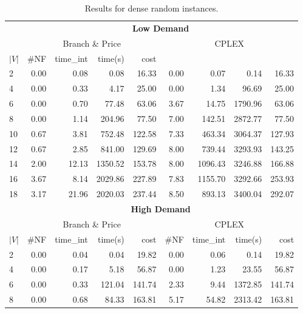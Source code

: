 \begin{table*}[h]
\small
\begin{center}
\caption{Results for dense random instances.}\label{tab:dense}
\begin{tabular} {l | r r r r | r r r r }
\hline
      &  \multicolumn{8}{c}{ \textbf{Low Demand} }                           \\
      &  \multicolumn{4}{c|}{Branch \& Price} & \multicolumn{4}{c}{CPLEX}    \\ 
$|V|$ & \#NF &  time\_int    &  time(s)       &  cost                         \\
\hline      
2&   0.00 & 0.08 & 0.08 & 16.33 & 0.00 & 0.07 & 0.14 & 16.33                \\  
4&   0.00 & 0.33 & 4.17 & 25.00 & 0.00 & 1.34 & 96.69 & 25.00               \\
6&   0.00 & 0.70 & 77.48 & 63.06 & 3.67 & 14.75 & 1790.96 & 63.06           \\
8&   0.00 & 1.14 & 204.96 & 77.50 & 7.00 & 142.51 & 2872.77 & 77.50         \\
10&  0.67 & 3.81 & 752.48 & 122.58 & 7.33 & 463.34 & 3064.37 & 127.93       \\
12&  0.67 & 2.85 & 841.00 & 129.69 & 8.00 & 739.44 & 3293.93 & 143.25       \\
14&  2.00 & 12.13 & 1350.52 & 153.78 & 8.00 & 1096.43 & 3246.88 & 166.88    \\
16&  3.67 & 8.14 & 2029.86 & 227.89 & 7.83  & 1155.70 & 3292.66 & 253.93    \\
18&  3.17 & 21.96 & 2020.03 & 237.44 & 8.50 & 893.13 & 3400.04 & 292.07     \\ 
\hline
       & \multicolumn{8}{c}{ \textbf{High Demand}} \\
       &       \multicolumn{4}{c|}{Branch \& Price} & \multicolumn{4}{c}{CPLEX}               \\  
$|V|$  & \#NF &  time\_int    &  time(s)       &  cost          &  \#NF &  time\_int  &  time(s)       &  cost \\
\hline      
2&    0.00 & 0.04 & 0.04 & 19.82 & 0.00 & 0.06 & 0.14 & 19.82              \\  
4&    0.00 & 0.17 & 5.18 & 56.87 & 0.00 & 1.23 & 23.55 & 56.87             \\
6&    0.00 & 0.33 & 121.04 & 141.74 & 2.33 & 9.44 & 1372.85 & 141.74       \\
8&    0.00 & 0.68 & 84.33 & 163.81 & 5.17 & 54.82 & 2313.42 & 163.81       \\

\end{tabular}
\end{center}
\end{table*}
